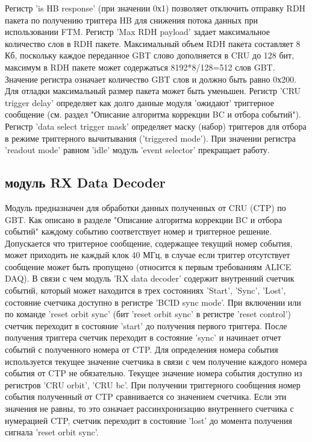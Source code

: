 \documentclass{article}
\begin{document}
Регистр 'is HB response' (при значении 0х1) позволяет отключить отправку RDH пакета по получению триггера HB для снижения потока данных при использовании FTM.
Регистр 'Max RDH payload' задает максимальное количество слов в RDH пакете. Максимальный объем RDH пакета составляет 8 Кб, поскольку каждое переданное GBT слово дополняется в CRU до 128 бит, максимум в RDH пакете может содержаться 8192*8/128=512 слов GBT. Значение регистра означает количество GBT слов и должно быть равно 0х200. Для отладки максимальный размер пакета может быть уменьшен.
Регистр 'CRU trigger delay' определяет как долго данные модуля 'ожидают' триггерное сообщение (см. раздел "Описание алгоритма коррекции BC и отбора событий").
Регистр 'data select trigger mask' определяет маску (набор) триггеров для отбора в режиме триггерного вычитывания ('triggered mode').  При значении регистра 'readout mode' равном 'idle' модуль 'event selector' прекращает работу.



\subsection{модуль RX Data Decoder}
Модуль предназначен для обработки данных полученных от CRU (CTP) по GBT. Как описано в разделе "Описание алгоритма коррекции BC и отбора событий" каждому событию соответствует номер и триггерное решение. Допускается что триггерное сообщение, содержащее текущий номер события, может приходить не каждый клок 40 МГц, в случае если триггер отсутствует сообщение может быть пропущено (относится к первым требованиям ALICE DAQ). В связи с чем модуль 'RX data decoder' содержит внутренний счетчик событий, который может находится в трех состояниях 'Start', 'Sync', 'Lost', состояние счетчика доступно в регистре 'BCID sync mode'. При включении или по команде 'reset orbit sync' (бит 'reset orbit sync' в регистре 'reset control') счетчик переходит в состояние 'start' до получения первого триггера. После получения триггера счетчик переходит в состояние 'sync' и начинает отчет событий с полученного номера от CTP. Для определения номера события используется текущее значение счетчика в связи с чем получение каждого номера события от CTP не обязательно. Текущее значение номера события доступно из регистров 'CRU orbit', 'CRU bc'. При получении триггерного сообщения номер события полученный от CTP сравнивается со значением счетчика. Если эти значения не равны, то это означает рассинхронизацию внутреннего счетчика с нумерацией CTP, счетчик переходит в состояние 'lost' до момента получения сигнала 'reset orbit sync'.
\end{document}
